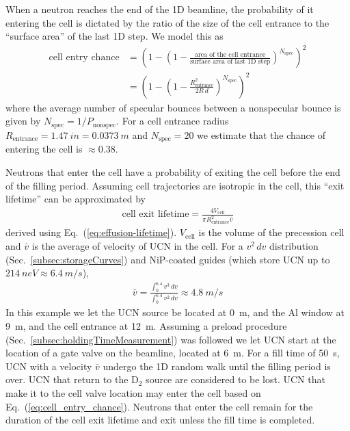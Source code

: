 When a neutron reaches the end of the 1D beamline, the probability of it entering the cell is dictated by the ratio of the size of the cell entrance to the ``surface area'' of the last 1D step. We model this as
%
\begin{align}
    \text{cell entry chance} &= \left(1 - \left( 1 - \frac{ \text{area of the cell entrance} } {\text{surface area of last 1D step}} \right) ^ {N_\text{spec}} \right)^2 \\
    &= \left(1 - \left( 1 - \frac{ R_\text{entrance}^{2} } {2 R \, d} \right) ^ {N_\text{spec}} \right) ^2\label{eq:cell_entry_chance}
\end{align}
%
where the average number of specular bounces between a nonspecular bounce is given by $N_\text{spec} = 1/P_\text{nonspec}$. For a cell entrance radius $R_\text{entrance}=\qty{1.47}{in}=\qty{0.0373}{m}$ and $N_\text{spec}=20$ we estimate that the chance of entering the cell  is $\approx 0.38$.

Neutrons that enter the cell have a probability of exiting the cell before the end of the filling period. Assuming cell trajectories are isotropic in the cell, this ``exit lifetime'' can be approximated by
%
\begin{gather}
    \text{cell exit lifetime} = \frac{4V_\text{cell}}{\pi R_\text{entrance}^2 \bar{v}}
\end{gather}
%
derived using Eq.~(\ref{eq:effusion-lifetime}). $V_\text{cell}$ is the volume of the precession cell and $\bar{v}$ is the average of velocity of UCN in the cell. For a $v^2\,dv$ distribution (Sec.~\ref{subsec:storageCurves}) and NiP-coated guides (which store UCN up to $\qty{214}{neV}\approx\qty{6.4}{m\per s}$), 
%
\begin{gather}
    \bar{v}=\frac{\int_0^{6.4}{v^3\,dv}}{\int_0^{6.4}{v^2\,dv}}\approx \qty{4.8}{m\per s}
\end{gather}
%
In this example we let the UCN source be located at \qty{0}{m}, and the Al window at \qty{9}{m}, and the cell entrance at \qty{12}{m}. Assuming a preload procedure (Sec.~\ref{subsec:holdingTimeMeasurement}) was followed we let UCN start at the location of a gate valve on the beamline, located at \qty{6}{m}. For a fill time of \qty{50}{s}, UCN with a velocity $\bar{v}$ undergo the 1D random walk until the filling period is over. UCN that return to the D$_2$ source are considered to be lost. UCN that make it to the cell valve location may enter the cell based on Eq.~(\ref{eq:cell_entry_chance}). Neutrons that enter the cell remain for the duration of the cell exit lifetime and exit unless the fill time is completed.

